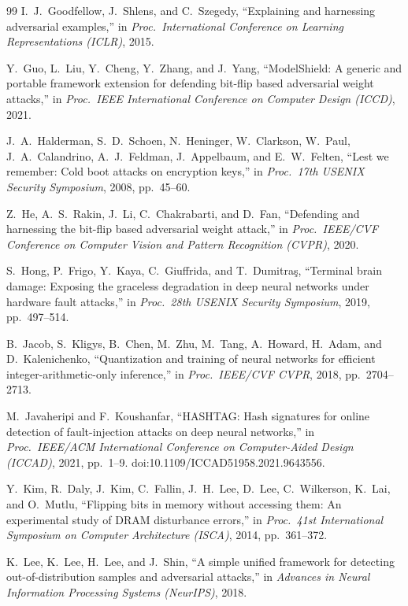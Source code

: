 \begin{thebibliography}{99}
I.~J.~Goodfellow, J.~Shlens, and C.~Szegedy, ``Explaining and harnessing adversarial examples,''
in \textit{Proc.\ International Conference on Learning Representations (ICLR)}, 2015.

Y.~Guo, L.~Liu, Y.~Cheng, Y.~Zhang, and J.~Yang, ``ModelShield: A generic and portable framework
extension for defending bit-flip based adversarial weight attacks,'' in \textit{Proc.\ IEEE
International Conference on Computer Design (ICCD)}, 2021.

J.~A.~Halderman, S.~D.~Schoen, N.~Heninger, W.~Clarkson, W.~Paul, J.~A.~Calandrino, A.~J.~Feldman,
J.~Appelbaum, and E.~W.~Felten, ``Lest we remember: Cold boot attacks on encryption keys,'' in
\textit{Proc.\ 17th USENIX Security Symposium}, 2008, pp.~45--60.

Z.~He, A.~S.~Rakin, J.~Li, C.~Chakrabarti, and D.~Fan, ``Defending and harnessing the bit-flip
based adversarial weight attack,'' in \textit{Proc.\ IEEE/CVF Conference on Computer Vision and
Pattern Recognition (CVPR)}, 2020.

S.~Hong, P.~Frigo, Y.~Kaya, C.~Giuffrida, and T.~Dumitra\c{s}, ``Terminal brain damage: Exposing
the graceless degradation in deep neural networks under hardware fault attacks,'' in
\textit{Proc.\ 28th USENIX Security Symposium}, 2019, pp.~497--514.

B.~Jacob, S.~Kligys, B.~Chen, M.~Zhu, M.~Tang, A.~Howard, H.~Adam, and D.~Kalenichenko,
``Quantization and training of neural networks for efficient integer-arithmetic-only inference,''
in \textit{Proc.\ IEEE/CVF CVPR}, 2018, pp.~2704--2713.

M.~Javaheripi and F.~Koushanfar, ``HASHTAG: Hash signatures for online detection of
fault-injection attacks on deep neural networks,'' in \textit{Proc.\ IEEE/ACM International
Conference on Computer-Aided Design (ICCAD)}, 2021, pp.~1--9. doi:10.1109/ICCAD51958.2021.9643556.

Y.~Kim, R.~Daly, J.~Kim, C.~Fallin, J.~H.~Lee, D.~Lee, C.~Wilkerson, K.~Lai, and O.~Mutlu,
``Flipping bits in memory without accessing them: An experimental study of DRAM disturbance
errors,'' in \textit{Proc.\ 41st International Symposium on Computer Architecture (ISCA)}, 2014,
pp.~361--372.

K.~Lee, K.~Lee, H.~Lee, and J.~Shin, ``A simple unified framework for detecting out-of-distribution
samples and adversarial attacks,'' in \textit{Advances in Neural Information Processing Systems
(NeurIPS)}, 2018.


\end{thebibliography}
